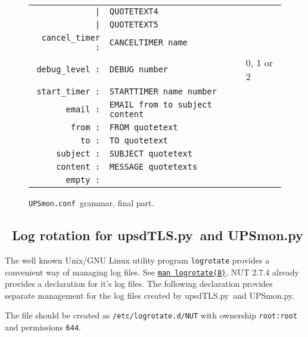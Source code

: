 \documentclass[12pt]{article}
\newlength{\headersep}\setlength{\headersep}{3mm}
\newcommand{\Hsep}{\hspace{\headersep}}
\newcommand{\newcolumn}{\vfill\eject}
\newcommand{\upsdTLS}{\mbox{\textcolor{UPSDCOLOUR}{upsdTLS.py}}}
\newcommand{\UPSmon}{\mbox{\textcolor{UPSMONCOLOUR}{UPSmon.py}}}
\newcommand{\UPSmonconf}{\textcolor{UPSMONCOLOUR}{\texttt{UPSmon.conf}}}
\newcommand{\LINman}[2]{\href{https://man7.org/linux/man-pages/man#2/#1.#2.html}{\texttt{man #1(#2)}}}
\begin{document}
\begin{figure}[ht]
\begin{center}
\begin{tabular}{|rp{0.55\LinePrinterwidth}|p{0.3\LinePrinterwidth}|}
          \texttt{|}       & \texttt{QUOTETEXT4} & \\
          \texttt{|}       & \texttt{QUOTETEXT5} & \\ \hline
\texttt{cancel\_timer :}   & \texttt{CANCELTIMER name} & \\ \hline
\texttt{debug\_level :}    & \texttt{DEBUG number} & 0, 1 or 2 \\ \hline
\texttt{start\_timer :}    & \texttt{STARTTIMER name number} & \\ \hline
\texttt{email :}           & \texttt{EMAIL from to subject content} & \\ \hline
\texttt{from :}            & \texttt{FROM quotetext} & \\ \hline
\texttt{to :}              & \texttt{TO quotetext} & \\ \hline
\texttt{subject :}         & \texttt{SUBJECT quotetext} & \\ \hline
\texttt{content :}         & \texttt{MESSAGE quotetexts} & \\ \hline
\texttt{empty :}           & & \\ \hline
\end{tabular}
\caption{\UPSmonconf\ grammar, final part.\label{fig:yacc:d}}
\end{center}
\end{figure}

\clearpage
\subsection{\Hsep\ Log rotation for \upsdTLS\ and \UPSmon}\label{section:logrotate}

The well known Unix/GNU Linux utility program \texttt{logrotate} provides a
convenient way of managing log files.  See \LINman{logrotate}{8}.  NUT 2.7.4
already provides a declaration for it's log files.  The following declaration
provides separate management for the log files created by \upsdTLS\ and
\UPSmon.

The file should be created as \texttt{/etc/logrotate.d/NUT} with ownership
\texttt{root:root} and permissions \texttt{644}.
\end{document}
